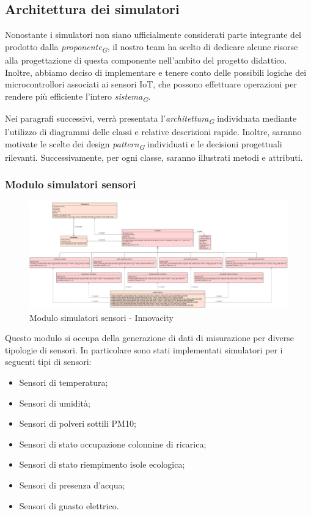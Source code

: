 \subsection{Architettura dei simulatori} \label{sec:architettura_simulatori}
Nonostante i simulatori non siano ufficialmente considerati parte integrante del prodotto dalla \textit{proponente}\textsubscript{\textit{G}}, il nostro team ha scelto di dedicare alcune risorse alla progettazione di questa componente nell'ambito del progetto didattico. Inoltre, abbiamo deciso di implementare e tenere conto delle possibili logiche dei microcontrollori associati ai sensori IoT, che possono effettuare operazioni per rendere più efficiente l'intero \textit{sistema}\textsubscript{\textit{G}}.

Nei paragrafi successivi, verrà presentata l'\textit{architettura}\textsubscript{\textit{G}} individuata mediante l'utilizzo di diagrammi delle classi e relative descrizioni rapide. Inoltre, saranno motivate le scelte dei design \textit{pattern}\textsubscript{\textit{G}} individuati e le decisioni progettuali rilevanti. Successivamente, per ogni classe, saranno illustrati metodi e attributi.
\subsubsection{Modulo simulatori sensori}
\begin{figure}[H]
    \centering
    \includegraphics[width=1.1\textwidth]{../Images/SpecificaTecnica/simulatoriSensori.PNG}
    \caption{Modulo simulatori sensori - Innovacity}
    \label{fig: Modulo_simulatori_sensori}
\end{figure}
Questo modulo si occupa della generazione di dati di misurazione per diverse tipologie di sensori.
In particolare sono stati implementati simulatori per i seguenti tipi di sensori:
\begin{itemize}
    \item Sensori di temperatura;
    \item Sensori di umidità;
    \item Sensori di polveri sottili PM10;
    \item Sensori di stato occupazione colonnine di ricarica;
    \item Sensori di stato riempimento isole ecologica;
    \item Sensori di presenza d'acqua;
    \item Sensori di guasto elettrico.
\end{itemize}
